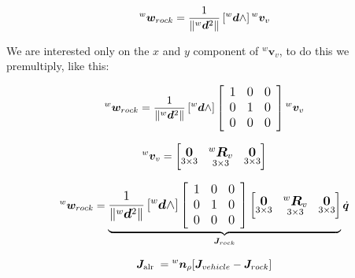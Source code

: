 \documentclass{article}
\begin{document}
\begin{equation}
\large
{^w}\boldsymbol w_{rock}=\frac{1}{\left\|{^w} \boldsymbol d^{2}\right\|}\left[{^w}{\boldsymbol d} \wedge\right] {{^w}{\boldsymbol v_{v}}}
\end{equation}

\noindent
We are interested only on the $x$ and $y$ component of ${^w}{\boldsymbol v_{v}}$, to do this we premultiply, like this:

\begin{equation}
\large
{^w}\boldsymbol w_{rock}=\frac{1}{\left\|{^w} \boldsymbol d^{2}\right\|}\left[{^w}{\boldsymbol d} \wedge\right]\left[\begin{array}{lll}
1 & 0 & 0 \\
0 & 1 & 0 \\
0 & 0 & 0
\end{array}\right] {^w}{\boldsymbol v_{v}}
\end{equation}

\begin{equation}
\large
{^w}\boldsymbol v_{v} = 
    \begin{bmatrix}
     \underset{3\times 3}{\boldsymbol{0}} & \underset{ 3\times 3}{^{w}\boldsymbol{R}_{v}} & \underset{3\times 3}{\boldsymbol{0}} \\
    \end{bmatrix}  
\end{equation}

\begin{equation}
\large
{^w}\boldsymbol w_{rock}=
\underbrace{
\frac{1}{\left\|{^w} \boldsymbol d^{2}\right\|}\left[{^w}{\boldsymbol d} \wedge\right]\left[\begin{array}{lll}
1 & 0 & 0 \\
0 & 1 & 0 \\
0 & 0 & 0
\end{array}\right]
    \begin{bmatrix}
     \underset{3\times 3}{\boldsymbol{0}} & \underset{ 3\times 3}{^{w}\boldsymbol{R}_{v}} & \underset{3\times 3}{\boldsymbol{0}} \\
    \end{bmatrix}
}_{\boldsymbol J_{rock}}
    \dot{\boldsymbol{q}}
\end{equation}


\begin{equation}
\large
\boldsymbol J_{\text {alr }}={^w}{\boldsymbol n_{\rho}}[{ \boldsymbol J_{vehicle} - \boldsymbol J_{rock}}]
\end{equation}
\end{document}
